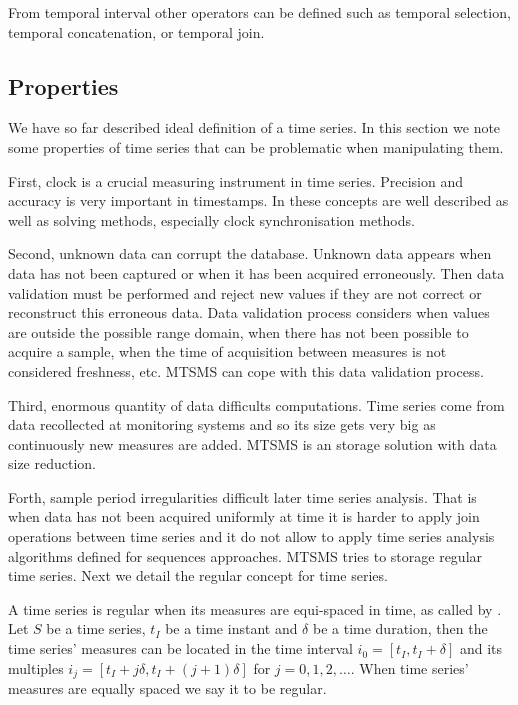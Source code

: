 From temporal interval other operators can be defined such as temporal
selection, temporal concatenation, or temporal join.




\subsection{Properties}


We have so far described ideal definition of a time series. In this
section we note some properties of time series that can be problematic
when manipulating them.

First, clock is a crucial measuring instrument in time
series. Precision and accuracy is very important in timestamps.  In
\cite{kopetz11:realtime} these concepts are well described as well as
solving methods, especially clock synchronisation methods.


Second, unknown data can corrupt the database. Unknown data appears
when data has not been captured or when it has been acquired
erroneously. Then data validation must be performed and reject new
values if they are not correct or reconstruct this erroneous data.
Data validation process considers when values are outside the possible
range domain, when there has not been possible to acquire a sample,
when the time of acquisition between measures is not considered
freshness, etc. MTSMS can cope with this data validation process.


Third, enormous quantity of data difficults computations.  Time series
come from data recollected at monitoring systems and so its size gets
very big as continuously new measures are added.  MTSMS is an storage
solution with data size reduction.



Forth, sample period irregularities difficult later time series
analysis. That is when data has not been acquired uniformly at time it
is harder to apply join operations between time series and it do not
allow to apply time series analysis algorithms defined for sequences
approaches.  MTSMS tries to storage regular time series.  Next we
detail the regular concept for time series.


A time series is regular when its measures are equi-spaced in time, as
called by \textcite{last:hetland}. Let $S$ be a time series, $t_I$ be a
time instant and $\delta$ be a time duration, then the time series'
measures can be located in the time interval $i_0=[t_I, t_I+\delta]$ and
its multiples $i_j=[t_I+j\delta, t_I+(j+1)\delta]$ for
$j=0,1,2,\ldots$. When time series' measures are equally spaced we say
it to be regular.

